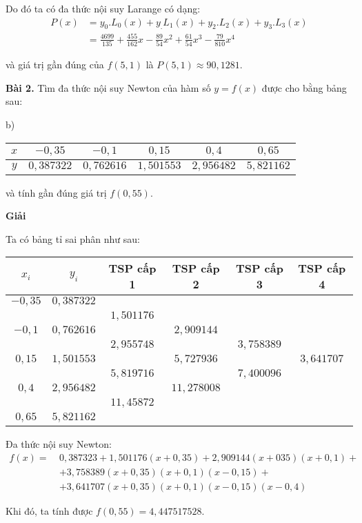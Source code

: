 Do đó ta có đa thức nội suy Larange có dạng:
\begin{align*}
	P(x)	& =y_0.L_0(x)+y_.L_1(x)+y_2.L_2(x)+y_3.L_3(x)\\
			& =\frac{4699}{135} + \frac{455}{162}x - \frac{89}{54}x^2 + \frac{61}{54}x^3 - \frac{79}{810}x^4
\end{align*}

và giá trị gần đúng của $f(5,1)$ là $P(5,1)\approx 90,1281$.

\textbf{Bài 2.} Tìm đa thức nội suy Newton của hàm số $y=f(x)$ được cho bằng bảng sau:\par
\begin{center}
b) \begin{tabular}{|c|c|c|c|c|c|}\hline
	$x$ & $-0,35$ & $-0,1$ & $0,15$ & $0,4$ & $0,65$\\ \hline
	$y$ & $0,387322$ & $0,762616$ & $1,501553$ & $2,956482$ & $5,821162$\\ \hline
\end{tabular}
\end{center}
và tính gần đúng giá trị $f\left(0,55\right)$.\par

\textbf{Giải}\par

Ta có bảng tỉ sai phân như sau:
\begin{longtable}{|c|c|c|c|c|c|}\hline
	$x_i$ & $y_i$ & TSP cấp 1 & TSP cấp 2 & TSP cấp 3 & TSP cấp 4\\ \hline
	\endhead
	$-0,35$ & $0,387322$ &&&& \\ \hline
	&&$1,501176$&&& \\ \hline
	$-0,1$ & $0,762616$&&$2,909144$&& \\ \hline
	&&$2,955748$&&$3,758389$&\\ \hline
	$0,15$&$1,501553$&&$5,727936$&&$3,641707$\\ \hline
	&&$5,819716$&&$7,400096$& \\ \hline
	$0,4$&$2,956482$&&$11,278008$&& \\ \hline
	&&$11,45872$&&& \\ \hline
	$0,65$&$5,821162$&&&& \\ \hline
\end{longtable}

Đa thức nội suy Newton:
\begin{align*}
	f(x) =~& 0,387323 + 1,501176(x+0,35) + 2,909144(x+035)(x+0,1) +\\
	&+ 3,758389(x+0,35)(x+0,1)(x-0,15) +\\
	&+ 3,641707(x+0,35)(x+0,1)(x-0,15)(x-0,4)
\end{align*}


Khi đó, ta tính được $f(0,55)=4,447517528$.\par
